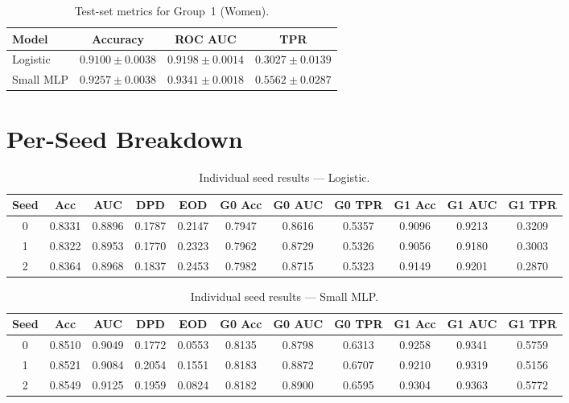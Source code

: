 \documentclass[11pt]{article}
\begin{document}
\begin{table}[h]
\centering
\caption{Test-set metrics for Group~1 (Women).}
\begin{tabular}{lccc}
\toprule
Model & Accuracy & ROC AUC & TPR \\
\midrule
Logistic   & $0.9100 \pm 0.0038$ & $0.9198 \pm 0.0014$ & $0.3027 \pm 0.0139$ \\
Small MLP  & $0.9257 \pm 0.0038$ & $0.9341 \pm 0.0018$ & $0.5562 \pm 0.0287$ \\
\bottomrule
\end{tabular}
\end{table}

\section*{Per-Seed Breakdown}

\begin{table}[h]
\centering
\caption{Individual seed results --- Logistic.}
\begin{tabular}{ccccccccccc}
\toprule
Seed & Acc & AUC & DPD & EOD & G0 Acc & G0 AUC & G0 TPR & G1 Acc & G1 AUC & G1 TPR \\
\midrule
0 & 0.8331 & 0.8896 & 0.1787 & 0.2147 & 0.7947 & 0.8616 & 0.5357 & 0.9096 & 0.9213 & 0.3209 \\
1 & 0.8322 & 0.8953 & 0.1770 & 0.2323 & 0.7962 & 0.8729 & 0.5326 & 0.9056 & 0.9180 & 0.3003 \\
2 & 0.8364 & 0.8968 & 0.1837 & 0.2453 & 0.7982 & 0.8715 & 0.5323 & 0.9149 & 0.9201 & 0.2870 \\
\bottomrule
\end{tabular}
\end{table}

\begin{table}[h]
\centering
\caption{Individual seed results --- Small MLP.}
\begin{tabular}{ccccccccccc}
\toprule
Seed & Acc & AUC & DPD & EOD & G0 Acc & G0 AUC & G0 TPR & G1 Acc & G1 AUC & G1 TPR \\
\midrule
0 & 0.8510 & 0.9049 & 0.1772 & 0.0553 & 0.8135 & 0.8798 & 0.6313 & 0.9258 & 0.9341 & 0.5759 \\
1 & 0.8521 & 0.9084 & 0.2054 & 0.1551 & 0.8183 & 0.8872 & 0.6707 & 0.9210 & 0.9319 & 0.5156 \\
2 & 0.8549 & 0.9125 & 0.1959 & 0.0824 & 0.8182 & 0.8900 & 0.6595 & 0.9304 & 0.9363 & 0.5772 \\
\bottomrule
\end{tabular}
\end{table}
\end{document}
